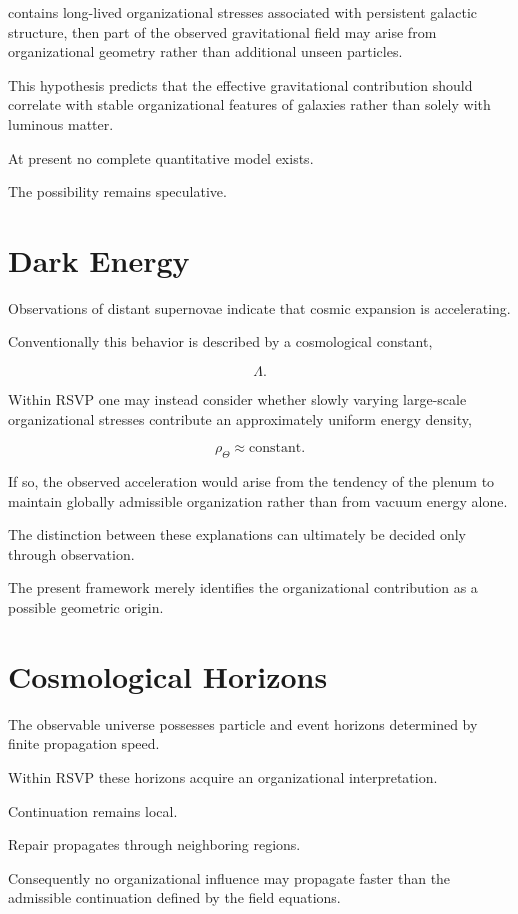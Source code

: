 \documentclass[11pt,oneside]{book}
\numberwithin{equation}{chapter}
\theoremstyle{definition}
\theoremstyle{plain}
\begin{document}
contains long-lived organizational stresses associated with persistent
galactic structure, then part of the observed gravitational field may arise
from organizational geometry rather than additional unseen particles.

This hypothesis predicts that the effective gravitational contribution
should correlate with stable organizational features of galaxies rather
than solely with luminous matter.

At present no complete quantitative model exists.

The possibility remains speculative.

\section{Dark Energy}

Observations of distant supernovae indicate that cosmic expansion is
accelerating.

Conventionally this behavior is described by a cosmological constant,

\[
\Lambda.
\]

Within RSVP one may instead consider whether slowly varying large-scale
organizational stresses contribute an approximately uniform energy density,

\[
\rho_\Theta
\approx
\text{constant}.
\]

If so, the observed acceleration would arise from the tendency of the plenum
to maintain globally admissible organization rather than from vacuum energy
alone.

The distinction between these explanations can ultimately be decided only
through observation.

The present framework merely identifies the organizational contribution as a
possible geometric origin.

\section{Cosmological Horizons}

The observable universe possesses particle and event horizons determined by
finite propagation speed.

Within RSVP these horizons acquire an organizational interpretation.

Continuation remains local.

Repair propagates through neighboring regions.

Consequently no organizational influence may propagate faster than the
admissible continuation defined by the field equations.
\end{document}

